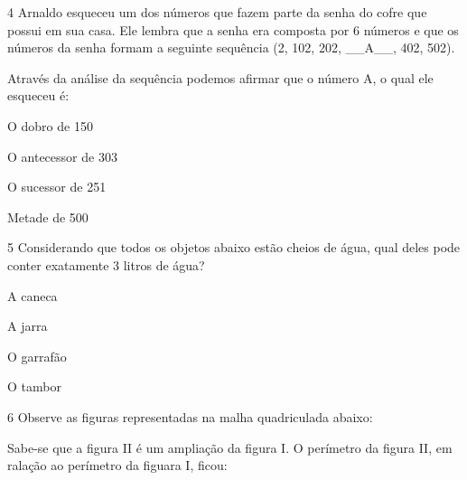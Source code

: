 \num{4} Arnaldo esqueceu um dos números que fazem parte da senha do cofre
que possui em sua casa. Ele lembra que a senha era composta por 6
números e que os números da senha formam a seguinte sequência (2, 102,
202, \_\_A\_\_, 402, 502).

Através da análise da sequência podemos afirmar que o número A, o qual
ele esqueceu é:

\begin{escolha}
\item
  O dobro de 150
\item
  O antecessor de 303
\item
  O sucessor de 251
\item
  Metade de 500
\end{escolha}


\num{5} Considerando que todos os objetos abaixo estão cheios de água, qual
deles pode conter exatamente 3 litros de água?


\begin{escolha}
\item
  A caneca
\item
  A jarra
\item
  O garrafão
\item
  O tambor
\end{escolha}


\num{6} Observe as figuras representadas na malha quadriculada abaixo:


Sabe-se que a figura II é um ampliação da figura I. O perímetro da
figura II, em ralação ao perímetro da figuara I, ficou:

